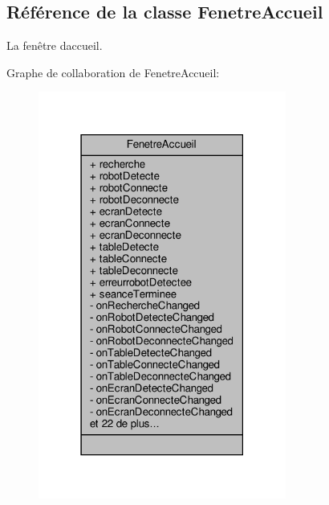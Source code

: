\hypertarget{class_fenetre_accueil}{}\subsection{Référence de la classe Fenetre\+Accueil}
\label{class_fenetre_accueil}


La fenêtre d\textquotesingle{}accueil.  




Graphe de collaboration de Fenetre\+Accueil\+:\nopagebreak
\begin{figure}[H]
\begin{center}
\leavevmode
\includegraphics[width=231pt]{class_fenetre_accueil__coll__graph}
\end{center}
\end{figure}
